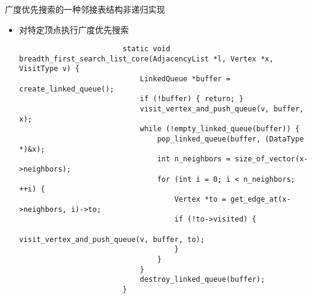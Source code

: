 \begin{fragile}
    \frametitle{\insertsubsectionhead}
    \begin{block}{广度优先搜索的一种\alert{邻接表}结构非递归实现}
        \begin{itemize}
            \item 对特定顶点执行广度优先搜索
                    \begin{verbatim}
                        static void breadth_first_search_list_core(AdjacencyList *l, Vertex *x, VisitType v) {
                            LinkedQueue *buffer = create_linked_queue();
                            if (!buffer) { return; }
                            visit_vertex_and_push_queue(v, buffer, x);
                            while (!empty_linked_queue(buffer)) {
                                pop_linked_queue(buffer, (DataType *)&x);
                                int n_neighbors = size_of_vector(x->neighbors);
                                for (int i = 0; i < n_neighbors; ++i) {
                                    Vertex *to = get_edge_at(x->neighbors, i)->to;
                                    if (!to->visited) {
                                        visit_vertex_and_push_queue(v, buffer, to);
                                    }
                                }
                            }
                            destroy_linked_queue(buffer);
                        }
                    \end{verbatim}
        \end{itemize}
    \end{block}
\end{fragile}